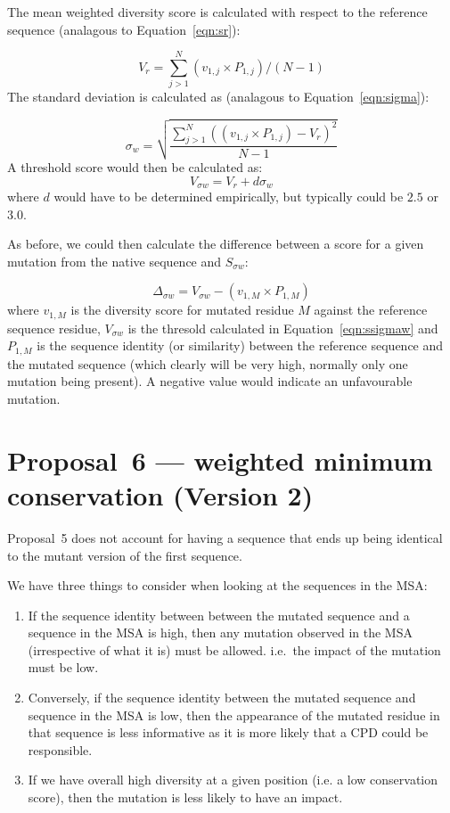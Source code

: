 \documentclass[a4paper]{article}
\begin{document}
The mean weighted diversity score is calculated with respect to the
reference sequence (analagous to Equation~\ref{eqn:sr}):

\begin{equation}\label{eqn:vr}
  V_{r} = \sum_{j>1}^N(v_{1, j} \times P_{1,j}) / (N-1)
\end{equation}
The standard deviation is calculated as (analagous to Equation~\ref{eqn:sigma}):

\begin{equation}
  \sigma_w = \sqrt{\frac{\sum_{j>1}^N((v_{1,j} \times P_{1,j}) - V_r)^2}{N-1}}
\end{equation}
A threshold score would then be calculated as:
\begin{equation}\label{eqn:ssigmaw}
  V_{\sigma w} = V_r + d\sigma_w
\end{equation}
where $d$ would have to be determined empirically, but typically could
be $2.5$ or $3.0$.

As before, we could then calculate the difference between a score for
a given mutation from the native sequence and $S_{\sigma w}$:

\begin{equation}
  \Delta_{\sigma w} = V_{\sigma w} - (v_{1, M} \times P_{1, M})
\end{equation}
where $v_{1,M}$ is the diversity score for mutated residue $M$ against
the reference sequence residue, $V_{\sigma w}$ is the thresold
calculated in Equation~\ref{eqn:ssigmaw} and $P_{1,M}$ is the sequence
identity (or similarity) between the reference sequence and the
mutated sequence (which clearly will be very high, normally only one
mutation being present). A negative value would indicate an
unfavourable mutation.


\section{Proposal~6 --- weighted minimum conservation (Version 2)}
Proposal~5 does not account for having a sequence that ends up being
identical to the mutant version of the first sequence.

We have three things to consider when looking at the sequences in the MSA:
\begin{enumerate}
  \item \label{item:highseqid} If the sequence identity between
    between the mutated sequence and a sequence in the MSA is high,
    then any mutation observed in the MSA (irrespective of what it is)
    must be allowed.  i.e.\ the impact of the mutation must be low.
  \item \label{item:lowseqid} Conversely, if the sequence identity between the
    mutated sequence and sequence in the MSA is low, then the
    appearance of the mutated residue in that sequence is less
    informative as it is more likely that a CPD could be responsible.
  \item If we have overall high diversity at a given position (i.e. a
    low conservation score), then the mutation is less likely to have
    an impact.
\end{enumerate}
\end{document}
